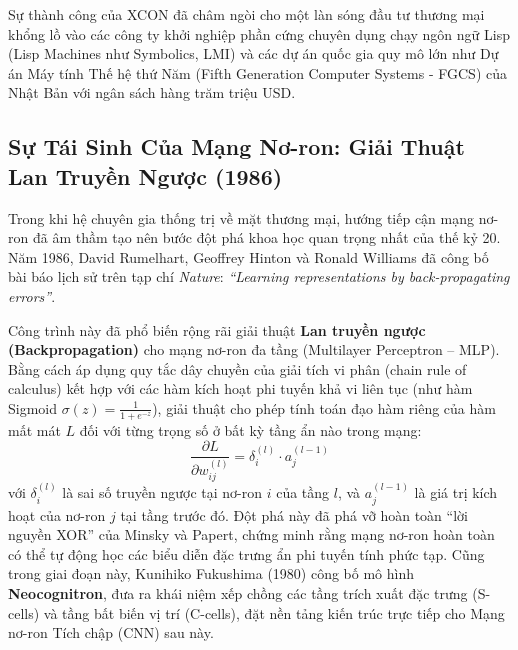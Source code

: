 \documentclass[12pt,a4paper]{report}
\begin{document}
Sự thành công của XCON đã châm ngòi cho một làn sóng đầu tư thương mại khổng lồ vào các công ty khởi nghiệp phần cứng chuyên dụng chạy ngôn ngữ Lisp (Lisp Machines như Symbolics, LMI) và các dự án quốc gia quy mô lớn như Dự án Máy tính Thế hệ thứ Năm (Fifth Generation Computer Systems - FGCS) của Nhật Bản với ngân sách hàng trăm triệu USD.

\subsection{Sự Tái Sinh Của Mạng Nơ-ron: Giải Thuật Lan Truyền Ngược (1986)}
Trong khi hệ chuyên gia thống trị về mặt thương mại, hướng tiếp cận mạng nơ-ron đã âm thầm tạo nên bước đột phá khoa học quan trọng nhất của thế kỷ 20. Năm 1986, David Rumelhart, Geoffrey Hinton và Ronald Williams đã công bố bài báo lịch sử trên tạp chí \textit{Nature}: \textit{“Learning representations by back-propagating errors”}.

Công trình này đã phổ biến rộng rãi giải thuật \textbf{Lan truyền ngược (Backpropagation)} cho mạng nơ-ron đa tầng (Multilayer Perceptron -- MLP). Bằng cách áp dụng quy tắc dây chuyền của giải tích vi phân (chain rule of calculus) kết hợp với các hàm kích hoạt phi tuyến khả vi liên tục (như hàm Sigmoid $\sigma(z) = \frac{1}{1 + e^{-z}}$), giải thuật cho phép tính toán đạo hàm riêng của hàm mất mát $L$ đối với từng trọng số ở bất kỳ tầng ẩn nào trong mạng:
\begin{equation}
\frac{\partial L}{\partial w_{ij}^{(l)}} = \delta_i^{(l)} \cdot a_j^{(l-1)}
\end{equation}
với $\delta_i^{(l)}$ là sai số truyền ngược tại nơ-ron $i$ của tầng $l$, và $a_j^{(l-1)}$ là giá trị kích hoạt của nơ-ron $j$ tại tầng trước đó. Đột phá này đã phá vỡ hoàn toàn “lời nguyền XOR” của Minsky và Papert, chứng minh rằng mạng nơ-ron hoàn toàn có thể tự động học các biểu diễn đặc trưng ẩn phi tuyến tính phức tạp. Cũng trong giai đoạn này, Kunihiko Fukushima (1980) công bố mô hình \textbf{Neocognitron}, đưa ra khái niệm xếp chồng các tầng trích xuất đặc trưng (S-cells) và tầng bất biến vị trí (C-cells), đặt nền tảng kiến trúc trực tiếp cho Mạng nơ-ron Tích chập (CNN) sau này.
\end{document}
